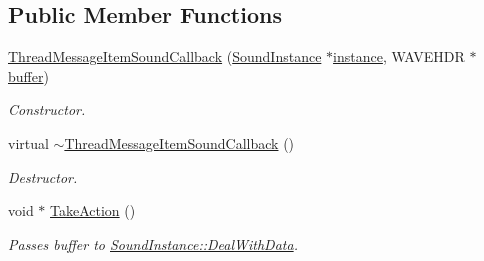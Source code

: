 \subsection*{Public Member Functions}
\begin{DoxyCompactItemize}
\item 
\hypertarget{class_thread_message_item_sound_callback_a42c3368a106e6b98441277f9480e3bc8}{
\hyperlink{class_thread_message_item_sound_callback_a42c3368a106e6b98441277f9480e3bc8}{ThreadMessageItemSoundCallback} (\hyperlink{class_sound_instance}{SoundInstance} $\ast$\hyperlink{class_thread_message_item_sound_callback_a2f14d3ff4bf20d65df2bf31678c5098e}{instance}, WAVEHDR $\ast$\hyperlink{class_thread_message_item_sound_callback_a56d59788abd5580fd7fa646d50d95d97}{buffer})}
\label{class_thread_message_item_sound_callback_a42c3368a106e6b98441277f9480e3bc8}

\begin{DoxyCompactList}\small\item\em Constructor. \item\end{DoxyCompactList}\item 
\hypertarget{class_thread_message_item_sound_callback_a9ccca7c9a0d97b471c63567ab5b3b27e}{
virtual \hyperlink{class_thread_message_item_sound_callback_a9ccca7c9a0d97b471c63567ab5b3b27e}{$\sim$ThreadMessageItemSoundCallback} ()}
\label{class_thread_message_item_sound_callback_a9ccca7c9a0d97b471c63567ab5b3b27e}

\begin{DoxyCompactList}\small\item\em Destructor. \item\end{DoxyCompactList}\item 
\hypertarget{class_thread_message_item_sound_callback_a2e38028aad4a3c7482efd0f3788e00b9}{
void $\ast$ \hyperlink{class_thread_message_item_sound_callback_a2e38028aad4a3c7482efd0f3788e00b9}{TakeAction} ()}
\label{class_thread_message_item_sound_callback_a2e38028aad4a3c7482efd0f3788e00b9}

\begin{DoxyCompactList}\small\item\em Passes buffer to \hyperlink{class_sound_instance_a0dfcabaf68f2aa2e90ca6a9cd5310b3c}{SoundInstance::DealWithData}. \item\end{DoxyCompactList}\end{DoxyCompactItemize}

